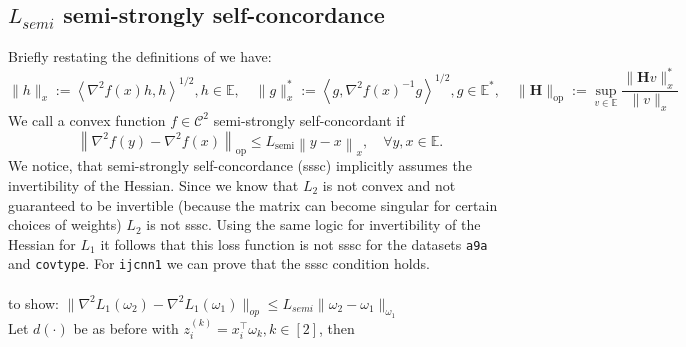 \documentclass{article}
\begin{document}
\subsection{$L_{semi}$ semi-strongly self-concordance}
Briefly restating the definitions of \cite{hanzely2022damped} we have:
$$\|h\|_x := \left\langle \nabla^2 f(x) h, h \right\rangle^{1/2}, h \in \mathbb{E}, \quad
%
\|g\|_x^* := \left\langle g, \nabla^2 f(x)^{-1} g \right\rangle^{1/2}, g \in \mathbb{E}^*,\quad 
%
\|\mathbf{H}\|_{\text{op}} := \sup_{v \in \mathbb{E}} \frac{\|\mathbf{H} v\|_x^*}{\|v\|_x}
$$
We call a convex function $f \in \mathcal{C}^2$ semi-strongly self-concordant if
\[
\left\| \nabla^2 f(y) - \nabla^2 f(x) \right\|_{\mathrm{op}} \leq L_{\mathrm{semi}} \left\| y - x \right\|_x, \quad \forall y, x \in \mathbb{E}.
\]
We notice, that semi-strongly self-concordance (sssc) implicitly assumes the invertibility of the Hessian. Since we know that $L_2$ is not convex and not guaranteed to be invertible (because the matrix can become singular for certain choices of weights) $L_2$ is not sssc. Using the same logic for invertibility of the Hessian for $L_1$ it follows that this loss function is not sssc for the datasets \texttt{a9a} and \texttt{covtype}. For \texttt{ijcnn1} we can prove that the sssc condition holds.\\
\\
to show: $\| \nabla ^2 L_1 (\omega _2) - \nabla ^2 L_1 (\omega _1)\|_{op} \leq L_{semi} \| \omega_2 - \omega_1 \|_{\omega_1}$\\
Let $d(\cdot)$ be as before with $z_i^{(k)} = x_i ^\top \omega_k, k\in [2]$, then 
\end{document}

